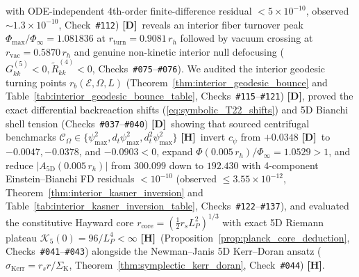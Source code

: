 \documentclass[11pt,a4paper]{article}
\newcommand{\catD}{\textbf{\textcolor{blue!75!black}{[D]}}}
\newcommand{\catH}{\textbf{\textcolor{orange!85!black}{[H]}}}
\theoremstyle{plain}
\theoremstyle{definition}
\theoremstyle{remark}
\numberwithin{equation}{section}
\begin{document}
\begin{enumerate}
with ODE-independent 4th-order finite-difference residual $< 5 \times 10^{-10}$, observed $\sim 1.3 \times 10^{-10}$, Check~\texttt{\#112}) \catD\ reveals an interior fiber turnover peak $\Phi_{\max}/\Phi_{\infty} = 1.081836$ at $r_{\text{turn}} = 0.9081\,r_h$ followed by vacuum crossing at $r_{\text{vac}} = 0.5870\,r_h$ and genuine non-kinetic interior null defocusing ($G^{(5)}_{kk} < 0, \tilde{R}^{(4)}_{kk} < 0$, Checks~\texttt{\#075}--\texttt{\#076}). We audited the interior geodesic turning points $r_b(\mathcal{E}, \Omega, L)$ (Theorem~\ref{thm:interior_geodesic_bounce} and Table~\ref{tab:interior_geodesic_bounce_table}, Checks~\texttt{\#115}--\texttt{\#121}) \catD, proved the exact differential backreaction shifts (\ref{eq:symbolic_T22_shifts}) and 5D Bianchi shell tension (Checks~\texttt{\#037}--\texttt{\#040}) \catD\ showing that sourced centrifugal benchmarks $\mathcal{C}_{\Omega} \in \{\psi_{\max}^2, d_t\psi_{\max}^2, d_t^2\psi_{\max}^2\}$ \catH\ invert $c_{\psi}$ from $+0.0348$ \catD\ to $-0.0047, -0.0378$, and $-0.0903 < 0$, expand $\Phi(0.005\,r_h)/\Phi_{\infty} = 1.0529 > 1$, and reduce $\vert{}A_{\text{5D}}(0.005\,r_h)\vert{}$ from $300.099$ down to $192.430$ with 4-component Einstein--Bianchi FD residuals $< 10^{-10}$ (observed $\le 3.55 \times 10^{-12}$, Theorem~\ref{thm:interior_kasner_inversion} and Table~\ref{tab:interior_kasner_inversion_table}, Checks~\texttt{\#122}--\texttt{\#137}), and evaluated the constitutive Hayward core $r_{\text{core}} = (\frac{1}{2}r_s L_P^2)^{1/3}$ with exact 5D Riemann plateau $\mathcal{K}_5(0) = 96 / L_P^4 < \infty$ \catH\ (Proposition~\ref{prop:planck_core_deduction}, Checks~\texttt{\#041}--\texttt{\#043}) alongside the Newman--Janis 5D Kerr--Doran ansatz ($\sigma_{\text{Kerr}} = r_s r / \Sigma_{\text{K}}$, Theorem~\ref{thm:symplectic_kerr_doran}, Check~\texttt{\#044}) \catH.


\end{enumerate}
\end{document}
